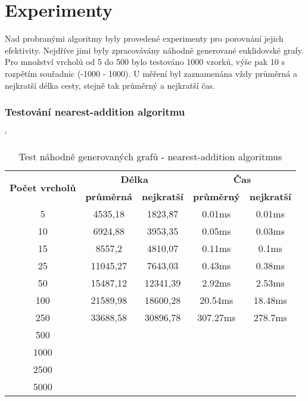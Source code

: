 \documentclass[
  printversion=false,
  joinlists=true,
  glossaries=true,
  figures=true,
  tables=true,
  sourcecodes=false,
  theorems=false,
  bibencoding=utf8,
  language=czech,
  encoding=utf8,
  program=infpvs,
  index=true,
  biblatex=true
]{kidiplom}
\begin{document}
\begin{figure}[H]
\begin{center}
\end{center}
\end{figure}
 \leavevmode\newline

\pagebreak
\section{Experimenty}
Nad probranými algoritmy byly provedené experimenty pro porovnání jejich efektivity. Nejdříve jimi byly zpracovávány náhodně generované euklidovské grafy. Pro množství vrcholů od 5 do 500 bylo testováno 1000 vzorků, výše pak 10 s rozpětím souřadnic (-1000 - 1000). U měření byl zaznamenána vždy průměrná a nejkratší délka cesty, stejně tak průměrný a nejkratší čas.

\subsubsection{Testování nearest-addition algoritmu}
\begin{table}[H]
\catcode`
\centering
\begin{tabular}{|c|c|c|c|c|}
\hline
\multirow{2}{*}{\textbf{Počet vrcholů}} & \multicolumn{2}{c|}{\textbf{Délka}}                                              & \multicolumn{2}{c|}{\textbf{Čas}} \\ \cline{2-5}
& \textbf{průměrná} & \textbf{nejkratší} & \textbf{průměrný} & \textbf{nejkratší} \\
\hline
5    & 4535,18   & 1823,87   & 0.01ms   & 0.01ms  \\
10   & 6924,88   & 3953,35   & 0.05ms   & 0.03ms  \\
15   & 8557,2    & 4810,07   & 0.11ms   & 0.1ms   \\
25   & 11045,27  & 7643,03   & 0.43ms   & 0.38ms  \\
50   & 15487,12  & 12341,39  & 2.92ms   & 2.53ms  \\
100  & 21589,98  & 18600,28  & 20.54ms  & 18.48ms \\
250  & 33688,58  & 30896,78  & 307.27ms & 278.7ms \\
500  &            &           &           &         \\
1000 &            &           &           &         \\
2500 &            &           &           &         \\
5000 &            &           &           &         \\
\hline
\end{tabular}
\caption{Test náhodně generovaných grafů - nearest-addition algoritmus}
\end{table}
\end{document}
